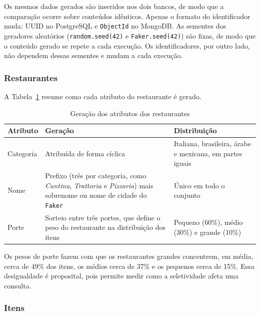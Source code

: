 Os mesmos dados gerados são inseridos nos dois bancos, de modo que a comparação ocorre sobre conteúdos
idênticos. Apenas o formato do identificador muda: UUID no PostgreSQL e \texttt{ObjectId} no MongoDB.
As sementes dos geradores aleatórios (\texttt{random.seed(42)} e \texttt{Faker.seed(42)}) são fixas, de
modo que o conteúdo gerado se repete a cada execução. Os identificadores, por outro lado, não dependem
dessas sementes e mudam a cada execução.


\subsubsection{Restaurantes}

A Tabela~\ref{tab:geracao-restaurantes} resume como cada atributo do restaurante é gerado.

\begin{table}[H]
    \centering
    \renewcommand{\arraystretch}{1.1}
    \caption{Geração dos atributos dos restaurantes}
    \label{tab:geracao-restaurantes}
    \small
    \begin{tabular}{|>{\raggedright\arraybackslash}p{3cm}|>{\raggedright\arraybackslash}p{6cm}|>{\raggedright\arraybackslash}p{5.2cm}|}
        \hline
        \textbf{Atributo} & \textbf{Geração} & \textbf{Distribuição} \\ \hline
        Categoria & Atribuída de forma cíclica & Italiana, brasileira, árabe e mexicana, em partes iguais \\ \hline
        Nome & Prefixo (três por categoria, como \textit{Cantina}, \textit{Trattoria} e \textit{Pizzaria}) mais sobrenome ou nome de cidade do \texttt{Faker} & Único em todo o conjunto \\ \hline
        Porte & Sorteio entre três portes, que define o peso do restaurante na distribuição dos itens & Pequeno (60\%), médio (30\%) e grande (10\%) \\ \hline
    \end{tabular}
    \vspace{0.4em}
\end{table}

Os pesos de porte fazem com que os restaurantes grandes concentrem,
em média, cerca de 49\% dos itens, os médios cerca de 37\% e os pequenos cerca de 15\%. Essa desigualdade
é proposital, pois permite medir como a seletividade afeta uma consulta.

\subsubsection{Itens}

